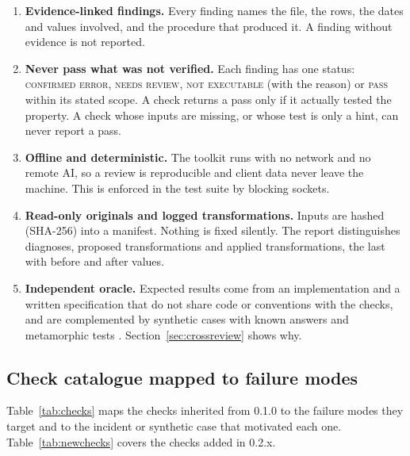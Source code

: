 \documentclass[11pt]{article}
\begin{document}
\begin{enumerate}[leftmargin=*,itemsep=2pt]
\item \textbf{Evidence-linked findings.} Every finding names the file, the rows, the dates and values involved, and the procedure that produced it. A finding without evidence is not reported.
\item \textbf{Never pass what was not verified.} Each finding has one status: \textsc{confirmed error}, \textsc{needs review}, \textsc{not executable} (with the reason) or \textsc{pass} within its stated scope. A check returns a pass only if it actually tested the property. A check whose inputs are missing, or whose test is only a hint, can never report a pass.
\item \textbf{Offline and deterministic.} The toolkit runs with no network and no remote AI, so a review is reproducible and client data never leave the machine. This is enforced in the test suite by blocking sockets.
\item \textbf{Read-only originals and logged transformations.} Inputs are hashed (SHA-256) into a manifest. Nothing is fixed silently. The report distinguishes diagnoses, proposed transformations and applied transformations, the last with before and after values.
\item \textbf{Independent oracle.} Expected results come from an implementation and a written specification that do not share code or conventions with the checks, and are complemented by synthetic cases with known answers and metamorphic tests \citep{BarrEtAl2015Oracle,SeguraEtAl2016Metamorphic}. Section~\ref{sec:crossreview} shows why.
\end{enumerate}

\subsection{Check catalogue mapped to failure modes}

Table~\ref{tab:checks} maps the checks inherited from 0.1.0 to the failure modes they target and to the incident or synthetic case that motivated each one. Table~\ref{tab:newchecks} covers the checks added in 0.2.x.
\end{document}
